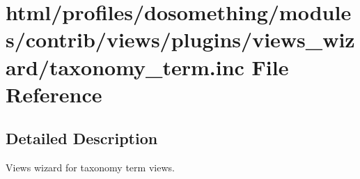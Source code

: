 \hypertarget{taxonomy__term_8inc}{
\section{html/profiles/dosomething/modules/contrib/views/plugins/views\_\-wizard/taxonomy\_\-term.inc File Reference}
\label{taxonomy__term_8inc}
}


\subsection{Detailed Description}
Views wizard for taxonomy term views. 